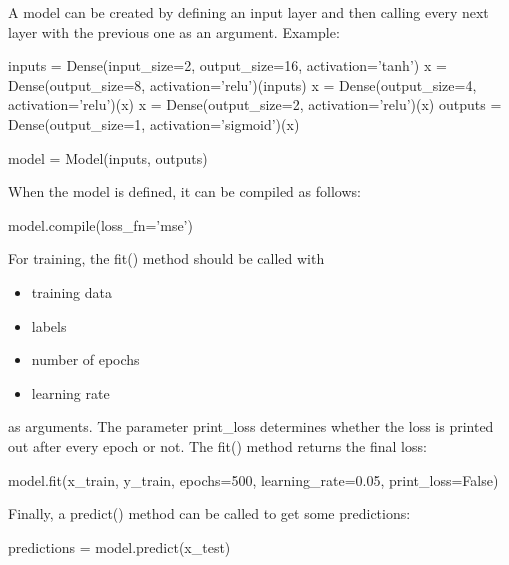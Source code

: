 \documentclass{article}
\begin{document}
A model can be created by defining an input layer and then calling every next layer
with the previous one as an argument. Example:
\begin{python}
inputs = Dense(input_size=2, output_size=16, activation='tanh')
x = Dense(output_size=8, activation='relu')(inputs)
x = Dense(output_size=4, activation='relu')(x)
x = Dense(output_size=2, activation='relu')(x)
outputs = Dense(output_size=1, activation='sigmoid')(x)

model = Model(inputs, outputs)
\end{python}

When the model is defined, it can be compiled as follows:
\begin{python}
model.compile(loss_fn='mse')
\end{python}

For training, the fit() method should be called with 
\begin{itemize}
    \item training data
    \item labels 
    \item number of epochs
    \item learning rate
\end{itemize}
as arguments. The parameter print\_loss determines whether the loss is printed out 
after every epoch or not. The fit() method returns the final loss:
\begin{python}
model.fit(x_train,
          y_train,
          epochs=500,
          learning_rate=0.05,
          print_loss=False)
\end{python}
Finally, a predict() method can be called to get some predictions:
\begin{python}
predictions = model.predict(x_test)
\end{python}
    \clearpage
\end{document}
